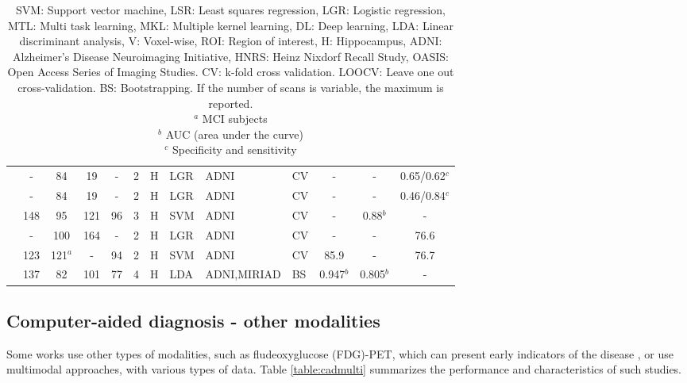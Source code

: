 \begin{table}[htbp]
{\begin{tabular}{@{}lcccccllllccc@{}}
 \cite{Fiot2012} & - & 84 & 19 & - & 2 & H & LGR & ADNI & CV & - & - & 0.65/0.62$^{c}$ \\
 \cite{Fiot2014} & - & 84 & 19 & - & 2 & H & LGR & ADNI & CV & - & - & 0.46/0.84$^{c}$ \\
 \cite{chincarini} & 148 & 95 & 121 & 96 & 3 & H & SVM & ADNI & CV & - & 0.88$^{b}$  & - \\ 
 \cite{Sanroma2017}  & - & 100 & 164 & - & 2 & H & LGR & ADNI & CV & - & - & 76.6 \\
 \cite{Shi2017} & 123 & 121$^{a}$ & - & 94 & 2 & H & SVM & ADNI & CV & 85.9 & - & 76.7 \\
 \cite{Platero2019} & 137 & 82 & 101 & 77 & 4 & H & LDA & ADNI,MIRIAD & BS & 0.947$^{b}$ & 0.805$^{b}$ & - \\
 \bottomrule
\end{tabular}}
\caption*{\footnotesize SVM: Support vector machine, LSR: Least squares regression, LGR: Logistic regression, MTL: Multi task learning, MKL: Multiple kernel learning, DL: Deep learning, LDA: Linear discriminant analysis, V: Voxel-wise, ROI: Region of interest, H: Hippocampus, ADNI: Alzheimer’s Disease Neuroimaging Initiative, HNRS: Heinz Nixdorf Recall Study, OASIS: Open Access Series of Imaging Studies. CV: k-fold cross validation. LOOCV: Leave one out cross-validation. BS: Bootstrapping. If the number of scans is variable, the maximum is reported. \\
         $^{a}$ MCI subjects \\
         $^{b}$ AUC (area under the curve) \\
         $^{c}$ Specificity and sensitivity \\
         }
\end{table}
\normalsize

\subsection{Computer-aided diagnosis - other modalities}

Some works use other types of modalities, such as fludeoxyglucose (FDG)-PET, which can present early indicators of the disease \cite{Jack2013}, or use multimodal approaches, with various types of data. Table \ref{table:cadmulti} summarizes the performance and characteristics of such studies. \\

